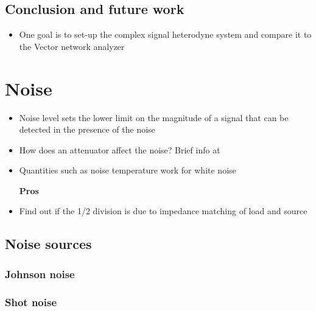 \documentclass[12pt]{report}
\begin{document}
\section{Conclusion and future work}

\begin{itemize}
    \item One goal is to set-up the complex signal heterodyne system and compare it to the Vector network analyzer
\end{itemize}
















\chapter{Noise}




\begin{itemize}
    \item Noise level sets the lower limit on the magnitude of a signal that can be detected in the presence of the noise
    \item How does an attenuator affect the noise? Brief info at \cite[p.~4]{Iulian}
    \item Quantities such as noise temperature work for white noise
\end{itemize}

\begin{itemize}
    \item [\textbf{Pros}]
    \item Find out if the 1/2 division is due to impedance matching of load and source
\end{itemize}





\section{Noise sources}

\subsection{Johnson noise}

\subsection{Shot noise}
\end{document}
